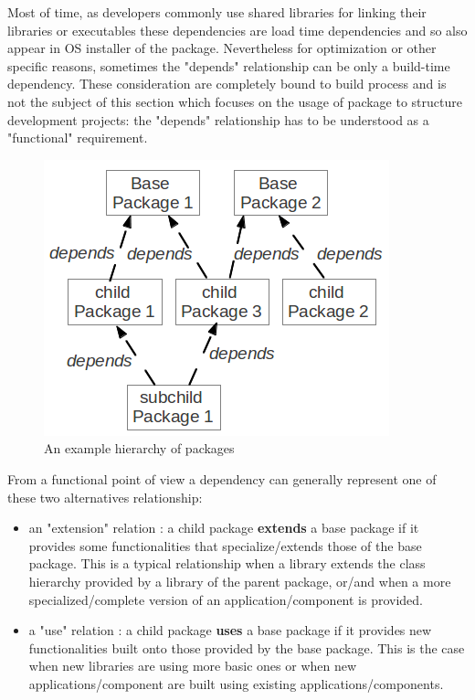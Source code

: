 \documentclass[12pt,a4paper]{article}
\begin{document}
Most of time, as developers commonly use shared libraries for linking their libraries or executables these dependencies are load time dependencies and so also appear in OS installer of the package. Nevertheless for optimization or other specific reasons, sometimes the "depends" relationship can be only a build-time dependency. These consideration are completely bound to build process and is not the subject of this section which focuses on the usage of package to structure development projects: the "depends" relationship has to be understood as a "functional" requirement.
\linebreak

\begin{figure}
\center
\includegraphics[scale=1]{images/package_hierarchy.png}
\caption{An example hierarchy of packages}
\label{fig-pack-hier}
\end{figure}

From a functional point of view a dependency can generally represent one of these two alternatives relationship:
\begin{itemize}
\item an "extension" relation : a child package \textbf{extends} a base package if it provides some functionalities that specialize/extends those of the base package. This is a typical relationship when a library extends the class hierarchy provided by a library of the parent package, or/and when a more specialized/complete version of an application/component is provided.
\item a "use" relation : a child package \textbf{uses} a base package if it provides new functionalities built onto those provided by the base package. This is the case when new libraries are using more basic ones or when new applications/component are built using existing applications/components.
\end{itemize}
\end{document}
